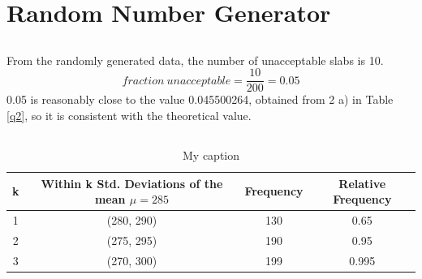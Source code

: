\documentclass[letterpaper]{article}
\begin{document}
\section{Random Number Generator} %

\subsection{} %
From the randomly generated data, the number of unacceptable slabs is 10.
$$ {fraction\ unacceptable = \frac{10}{200} = 0.05} $$ 0.05 is reasonably close
to the value 0.045500264, obtained from 2 a) in Table \ref{q2}, so it is
consistent with the theoretical value.

\subsection{}


%

\begin{table}[H]
 \centering
 \begin{tabular}{|c|c|c|c|}
  \hline
  \textbf{k} & \textbf{Within k Std. Deviations of the mean $\mu=285$} & \textbf{Frequency} & \textbf{Relative Frequency} \\ \hline
  1          & (280, 290)                                              & 130                & 0.65                        \\\hline
  2          & (275, 295)                                              & 190                & 0.95                        \\ \hline
  3          & (270, 300)                                              & 199                & 0.995                       \\ \hline
 \end{tabular}
 \caption{My caption}
 \label{q3}
\end{table}
\end{document}
